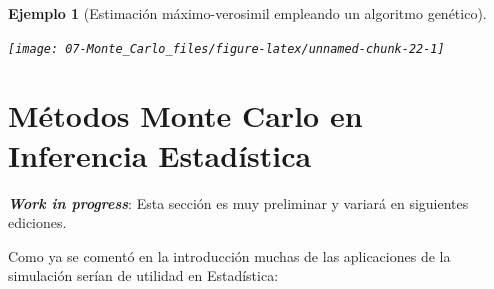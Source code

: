 \documentclass[
]{book}
\newenvironment{Shaded}{\begin{snugshade}}{\end{snugshade}}
\newcommand{\AttributeTok}[1]{\textcolor[rgb]{0.77,0.63,0.00}{#1}}
\newcommand{\CommentTok}[1]{\textcolor[rgb]{0.56,0.35,0.01}{\textit{#1}}}
\newcommand{\DecValTok}[1]{\textcolor[rgb]{0.00,0.00,0.81}{#1}}
\newcommand{\FunctionTok}[1]{\textcolor[rgb]{0.00,0.00,0.00}{#1}}
\newcommand{\NormalTok}[1]{#1}
\newcommand{\SpecialCharTok}[1]{\textcolor[rgb]{0.00,0.00,0.00}{#1}}
\theoremstyle{break}
\newtheorem{example}{Ejemplo}[chapter]
\theoremstyle{nonumberplain}
\renewcommand{\CommentTok}[1]{\textcolor[rgb]{0.41,0.41,0.41}{\texttt{#1}}}
\begin{document}
\begin{example}[Estimación máximo-verosimil empleando un algoritmo genético]
\begin{Shaded}
\end{Shaded}

\begin{center}\texttt{[image: 07-Monte\_Carlo\_files/figure-latex/unnamed-chunk-22-1]} \end{center}

\end{example}

\hypertarget{aplic-inf}{%
\section{Métodos Monte Carlo en Inferencia Estadística}\label{aplic-inf}}

\textbf{\emph{Work in progress}}: Esta sección es muy preliminar y variará en siguientes ediciones.

Como ya se comentó en la introducción muchas de las aplicaciones de la simulación serían de utilidad en Estadística:
\end{document}

